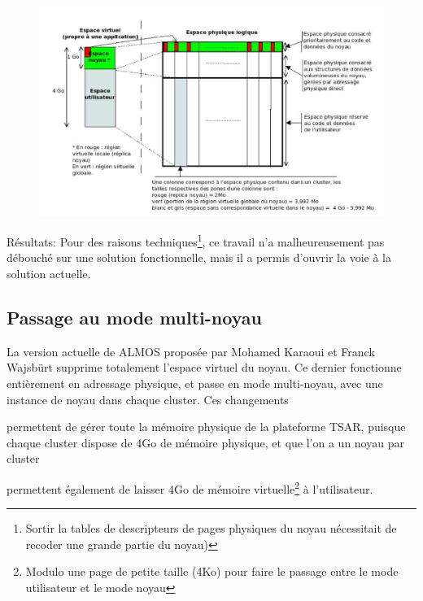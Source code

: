       \begin{figure}[!h]
        \centering
        \includegraphics[scale=0.17]{include/img/almos-guerret}
        \caption{}
        \label{almos-guerret}
      \end{figure}
      
      \begin{paragraph}{Résultats:}
        Pour des raisons techniques\footnote{Sortir la tables de descripteurs de
          pages physiques du noyau nécessitait de recoder une grande partie du
          noyau)}, ce travail n'a malheureusement pas débouché sur une solution
        fonctionnelle, mais il a permis d'ouvrir la voie à la solution actuelle.
      \end{paragraph}

      
  \subsection{Passage au mode multi-noyau}
      
    La version actuelle de ALMOS proposée par Mohamed Karaoui et Franck Wajsbürt
    supprime totalement l'espace virtuel du noyau. Ce dernier fonctionne
    entièrement en adressage physique, et passe en mode multi-noyau, avec une
    instance de noyau dans chaque cluster. Ces changements \benumline \item
    permettent de gérer toute la mémoire physique de la plateforme TSAR, puisque
    chaque cluster dispose de 4Go de mémoire physique, et que l'on a un noyau
    par cluster \item permettent également de laisser 4Go de mémoire
    virtuelle\footnote{Modulo une page de petite taille (4Ko) pour faire le
      passage entre le mode utilisateur et le mode noyau} à
    l'utilisateur\eenumline.


